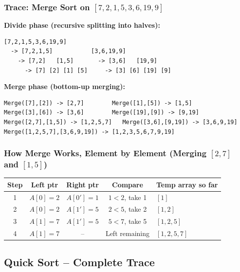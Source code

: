 \documentclass[12pt,portrait]{article}
\begin{document}
\subsubsection{Trace: Merge Sort on $[7,2,1,5,3,6,19,9]$}

\textbf{Divide phase (recursive splitting into halves):}
\begin{verbatim}
[7,2,1,5,3,6,19,9]
  -> [7,2,1,5]           [3,6,19,9]
    -> [7,2]   [1,5]       -> [3,6]   [19,9]
      -> [7] [2] [1] [5]     -> [3] [6] [19] [9]
\end{verbatim}

\textbf{Merge phase (bottom-up merging):}
\begin{verbatim}
Merge([7],[2]) -> [2,7]        Merge([1],[5]) -> [1,5]
Merge([3],[6]) -> [3,6]        Merge([19],[9]) -> [9,19]
Merge([2,7],[1,5]) -> [1,2,5,7]   Merge([3,6],[9,19]) -> [3,6,9,19]
Merge([1,2,5,7],[3,6,9,19]) -> [1,2,3,5,6,7,9,19]
\end{verbatim}

\subsubsection{How Merge Works, Element by Element (Merging $[2,7]$ and $[1,5]$)}

\begin{center}
\begin{tabular}{c|c|c|c|l}
\toprule
\textbf{Step} & \textbf{Left ptr} & \textbf{Right ptr} & \textbf{Compare} & \textbf{Temp array so far} \\
\midrule
1 & $A[0]=2$ & $A[0']=1$ & $1 < 2$, take 1 & $[1]$ \\
2 & $A[0]=2$ & $A[1']=5$ & $2 < 5$, take 2 & $[1,2]$ \\
3 & $A[1]=7$ & $A[1']=5$ & $5 < 7$, take 5 & $[1,2,5]$ \\
4 & $A[1]=7$ & -- & Left remaining & $[1,2,5,7]$ \\
\bottomrule
\end{tabular}
\end{center}

\subsection{Quick Sort -- Complete Trace}
\end{document}
